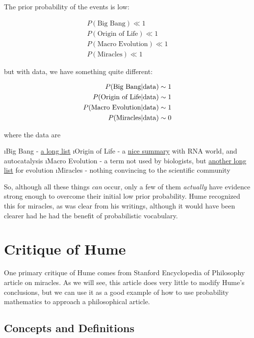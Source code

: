 \documentclass{tufte-book}
\begin{document}
The prior probability of the events is low:

\begin{eqnarray*}
P(\mbox{Big Bang})\ll 1 \\
P(\mbox{Origin of Life})\ll 1 \\
P(\mbox{Macro Evolution})\ll 1 \\
P(\mbox{Miracles})\ll 1
\end{eqnarray*}

but with data, we have something quite different:

\begin{eqnarray*}
P(\mbox{Big Bang}|{\rm data})\sim 1 \\
P(\mbox{Origin of Life}|{\rm data})\sim 1 \\
P(\mbox{Macro Evolution}|{\rm data})\sim 1 \\
P(\mbox{Miracles}|{\rm data})\sim  0
\end{eqnarray*}

where the data are

\bi
\i Big Bang -
\href{http://www.talkorigins.org/faqs/astronomy/bigbang.html}{a long list}
\i Origin of Life - a
\href{http://en.wikipedia.org/wiki/Abiogenesis}{nice summary} with RNA
world, and autocatalysis \i Macro Evolution - a term not used by
biologists, but
\href{http://www.talkorigins.org/faqs/comdesc/}{another long list} for
evolution \i Miracles - nothing convincing to the scientific community
\ei

So, although all these things \emph{can} occur, only a few of them
\emph{actually} have evidence strong enough to overcome their initial
low prior probability. Hume recognized this for miracles, as was clear
from his writings, although it would have been clearer had he had the
benefit of probabilistic vocabulary.

\section{Critique of Hume}\label{critique-of-hume}

One primary critique of Hume comes from Stanford Encyclopedia of
Philosophy article on miracles\citep{sep-miracles}. As we will see, this
article does very little to modify Hume's conclusions, but we can use it
as a good example of how to use probability mathematics to approach a
philosophical article.

\subsection{Concepts and Definitions}\label{concepts-and-definitions}
\end{document}
